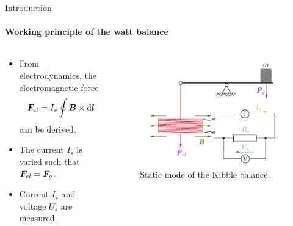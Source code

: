\documentclass{beamer}
\begin{document}
\begin{frame}[allowframebreaks]{Introduction}
\framesubtitle{Working principle of the watt balance}
  \begin{columns}
    \begin{column}{0.49\textwidth}
    \begin{itemize}
        \item From electrodynamics, the electromagnetic force \begin{equation}\label{eq:electromagnetic_force}
            \bm{F}_{el} = I_s\oint\bm{B}\times \mathrm{d}\bm{l}
        \end{equation} can be derived.
        \item The current $I_s$ is varied such that $\bm{F}_{el} = \bm{F}_g$.
        \item Current $I_s$ and voltage $U_s$ are measured.
    \end{itemize}
    \end{column}
    
    \begin{column}{0.5\textwidth}
      \begin{figure}[h!] 
        		\centering
		\includegraphics[width=\textwidth]{figures/balancestatic.pdf}
		\caption{Static mode of the Kibble balance.}
		\label{fig:balancestatic}
      \end{figure}
    \end{column}
  \end{columns}
\end{frame}
\end{document}
